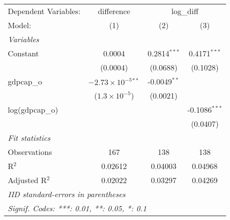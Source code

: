 
\begingroup
\centering
\begin{tabular}{lccc}
   \tabularnewline \midrule \midrule
   Dependent Variables: & difference & \multicolumn{2}{c}{log\_diff}\\
   Model:          & (1)                           & (2)            & (3)\\  
   \midrule
   \emph{Variables}\\
   Constant        & 0.0004                        & 0.2814$^{***}$ & 0.4171$^{***}$\\   
                   & (0.0004)                      & (0.0688)       & (0.1028)\\   
   gdpcap\_o       & $-2.73\times 10^{-5}$$^{**}$  & -0.0049$^{**}$ &   \\   
                   & ($1.3\times 10^{-5}$)         & (0.0021)       &   \\   
   log(gdpcap\_o)  &                               &                & -0.1086$^{***}$\\   
                   &                               &                & (0.0407)\\   
   \midrule
   \emph{Fit statistics}\\
   Observations    & 167                           & 138            & 138\\  
   R$^2$           & 0.02612                       & 0.04003        & 0.04968\\  
   Adjusted R$^2$  & 0.02022                       & 0.03297        & 0.04269\\  
   \midrule \midrule
   \multicolumn{4}{l}{\emph{IID standard-errors in parentheses}}\\
   \multicolumn{4}{l}{\emph{Signif. Codes: ***: 0.01, **: 0.05, *: 0.1}}\\
\end{tabular}
\par\endgroup


